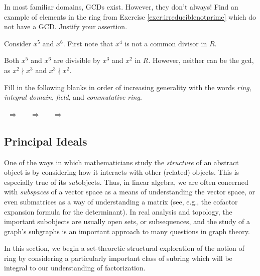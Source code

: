 \documentclass[english,course]{lecture}
\newenvironment{solution}[1][Solution]{\begin{trivlist}\pushQED{\qed}\item[\hskip \labelsep  \bfseries #1{}.\hspace{10pt}]}{\popQED\end{trivlist}}\renewcommand{\qedsymbol}{$\checkmark$}{\newenvironment{answer}{\renewcommand\qedsymbol{$\blacklozenge$}\begin{proof}[Answer]}{\end{proof}}}\newenvironment{answer}[1][Answer]{\begin{trivlist}\pushQED{\qed}\item[\hskip \labelsep  \bfseries #1{}.\hspace{10pt}]}{\popQED\end{trivlist}}\renewcommand{\qedsymbol}{$\lozenge$}
\theoremstyle{plain}
\def\presnotes{}
\begin{document}
\presnotes


\begin{exer}
	In most familiar domains, GCDs exist.
	However, they don't always!
	Find an example of elements in the ring from Exercise \ref{exer:irreduciblenotprime} which do not have a GCD.
	Justify your assertion.
\end{exer}

\begin{solution}
	Consider $x^5$ and $x^6$.
	First note that $x^4$ is not a common divisor in $R$.
	
	Both $x^5$ and $x^6$ are divisible by $x^3$ and $x^2$ in $R$.
	However, neither can be the gcd, as $x^2\nmid x^3$ and $x^3\nmid x^2$.
\end{solution}

\presnotes

\begin{exer}\label{exer:ringgeneralityone}
	Fill in the following blanks in order of increasing generality with the words \emph{ring}, \emph{integral domain}, \emph{field}, and \emph{commutative ring}.
	
	\begin{center}
		\makebox[0.75in]{\hrulefill} \ $\Rightarrow$ \ \makebox[0.75in]{\hrulefill} \ $\Rightarrow$ \ \makebox[0.75in]{\hrulefill} \ $\Rightarrow$ \ \makebox[0.75in]{\hrulefill} 
	\end{center}
\end{exer}

\presnotes

\clearpage



\subsection{Principal Ideals}

One of the ways in which mathematicians study the \emph{structure} of an abstract object is by considering how it interacts with other (related) objects.
This is especially true of its \emph{sub}objects.
Thus, in linear algebra, we are often concerned with \emph{subspaces} of a vector space as a means of understanding the vector space, or even submatrices as a way of understanding a matrix (see, e.g., the cofactor expansion formula for the determinant).
In real analysis and topology, the important subobjects are usually open sets, or subsequences, and the study of a graph's subgraphs is an important approach to many questions in graph theory.

In this section, we begin a set-theoretic structural exploration of the notion of ring by considering a particularly important class of subring which will be integral to our understanding of factorization.
\end{document}
